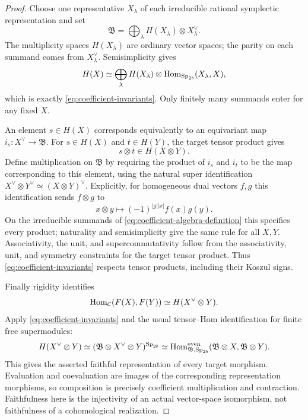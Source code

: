 \begin{proof}
Choose one representative \(X_\lambda\) of each irreducible rational
symplectic representation and set
\begin{equation}
 \label{eq:coefficient-algebra-definition}
 \mathfrak B=
 \bigoplus_\lambda H(X_\lambda)\otimes X_\lambda^\vee.
\end{equation}
The multiplicity spaces \(H(X_\lambda)\) are ordinary vector spaces;
the parity on each summand comes from \(X_\lambda^\vee\).
Semisimplicity gives
\[
 H(X)\simeq
 \bigoplus_\lambda
 H(X_\lambda)\otimes\operatorname{Hom}_{\operatorname{Sp}_{2b}}(X_\lambda,X),
\]
which is exactly \eqref{eq:coefficient-invariants}.
Only finitely many summands enter for any fixed \(X\).

An element \(s\in H(X)\) corresponds equivalently to an equivariant
map \(i_s\colon X^\vee\to\mathfrak B\).  For
\(s\in H(X)\) and \(t\in H(Y)\), the target tensor product gives
\[
 s\otimes t\in H(X\otimes Y).
\]
Define multiplication on \(\mathfrak B\) by requiring the product of
\(i_s\) and \(i_t\) to be the map corresponding to this element,
using the natural super identification
\(X^\vee\otimes Y^\vee\simeq(X\otimes Y)^\vee\).
Explicitly, for homogeneous dual vectors \(f,g\) this identification
sends \(f\otimes g\) to
\[
 x\otimes y\longmapsto(-1)^{|g||x|}f(x)g(y).
\]
On the irreducible summands of
\eqref{eq:coefficient-algebra-definition} this specifies every
product; naturality and semisimplicity give the same rule for all
\(X,Y\).  Associativity, the unit, and supercommutativity follow from
the associativity, unit, and symmetry constraints for the target
tensor product.  Thus \eqref{eq:coefficient-invariants} respects
tensor products, including their Koszul signs.

Finally rigidity identifies
\[
 \operatorname{Hom}_{\mathcal C}(F(X),F(Y))
 \simeq H(X^\vee\otimes Y).
\]
Apply \eqref{eq:coefficient-invariants} and the usual tensor--Hom
identification for finite free supermodules:
\[
 H(X^\vee\otimes Y)
 \simeq(\mathfrak B\otimes X^\vee\otimes Y)^{\operatorname{Sp}_{2b}}
 \simeq
 \operatorname{Hom}^{\mathrm{even}}_{\mathfrak B,\operatorname{Sp}_{2b}}
   (\mathfrak B\otimes X,\mathfrak B\otimes Y).
\]
This gives the asserted faithful representation of every target
morphism.  Evaluation and
coevaluation are images of the corresponding representation
morphisms, so composition is precisely coefficient multiplication
and contraction.  Faithfulness here is the injectivity of an actual
vector-space isomorphism, not faithfulness of a cohomological
realization.
\end{proof}

